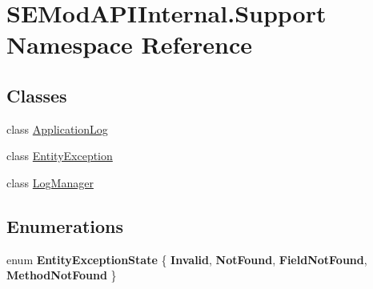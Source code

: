 \hypertarget{namespace_s_e_mod_a_p_i_internal_1_1_support}{}\section{S\+E\+Mod\+A\+P\+I\+Internal.\+Support Namespace Reference}
\label{namespace_s_e_mod_a_p_i_internal_1_1_support}
\subsection*{Classes}
\begin{DoxyCompactItemize}
\item 
class \hyperlink{class_s_e_mod_a_p_i_internal_1_1_support_1_1_application_log}{Application\+Log}
\item 
class \hyperlink{class_s_e_mod_a_p_i_internal_1_1_support_1_1_entity_exception}{Entity\+Exception}
\item 
class \hyperlink{class_s_e_mod_a_p_i_internal_1_1_support_1_1_log_manager}{Log\+Manager}
\end{DoxyCompactItemize}
\subsection*{Enumerations}
\begin{DoxyCompactItemize}
\item 
\hypertarget{namespace_s_e_mod_a_p_i_internal_1_1_support_a3bf3bfbc2307d8fb2401b13a32bed000}{}enum {\bfseries Entity\+Exception\+State} \{ {\bfseries Invalid}, 
{\bfseries Not\+Found}, 
{\bfseries Field\+Not\+Found}, 
{\bfseries Method\+Not\+Found}
 \}\label{namespace_s_e_mod_a_p_i_internal_1_1_support_a3bf3bfbc2307d8fb2401b13a32bed000}

\end{DoxyCompactItemize}
